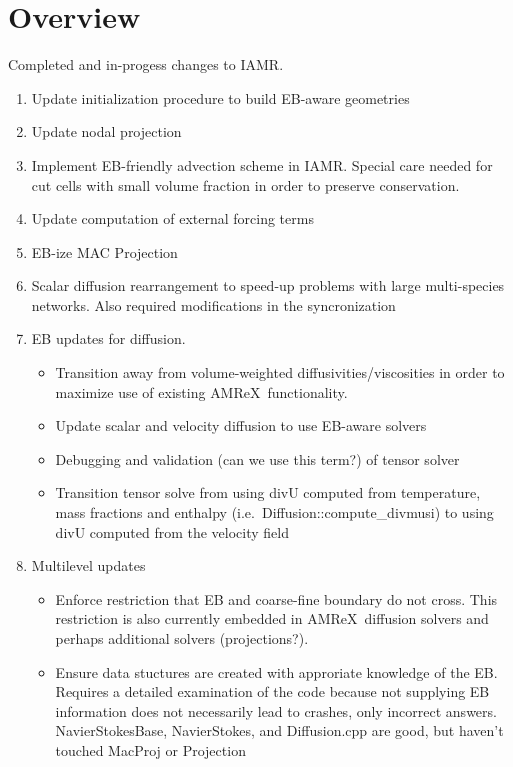 \documentclass[11pt]{report}
\newcommand{\iamr}{{\sf IAMR}}
\newcommand{\amrex}{{\sf AMReX}}
\begin{document}
\chapter{Overview}

Completed and in-progess changes to \iamr.
\begin{enumerate}
\item
  Update initialization procedure to build EB-aware geometries
\item
  Update nodal projection
\item
  Implement EB-friendly advection scheme in \iamr. Special care needed for cut cells with small volume fraction in order to preserve conservation.
\item
  Update computation of external forcing terms
\item
  EB-ize MAC Projection
\item
  Scalar diffusion rearrangement to speed-up problems with large multi-species networks. Also required modifications in the syncronization
\item
  EB updates for diffusion.
  \begin{itemize}
  \item
    Transition away from volume-weighted diffusivities/viscosities in order to maximize use of existing \amrex\ functionality. 
  \item
    Update scalar and velocity diffusion to use EB-aware solvers
  \item
    Debugging and validation (can we use this term?) of tensor solver
  \item
    Transition tensor solve from using divU computed from temperature, mass fractions and enthalpy (i.e.\ Diffusion::compute\_divmusi) to using divU computed from the velocity field  
  \end{itemize}
\item
  Multilevel updates
  \begin{itemize}
  \item
    Enforce restriction that EB and coarse-fine boundary do not cross. This restriction is also currently embedded in \amrex\ diffusion solvers and perhaps additional solvers (projections?).
  \item
    Ensure data stuctures are created with approriate knowledge of the EB.
    Requires a detailed examination of the code because not supplying EB information does not necessarily lead to crashes, only incorrect answers.
    NavierStokesBase, NavierStokes, and Diffusion.cpp are good, but haven't touched MacProj or Projection
  \end{itemize}  
\end{enumerate}
\end{document}
